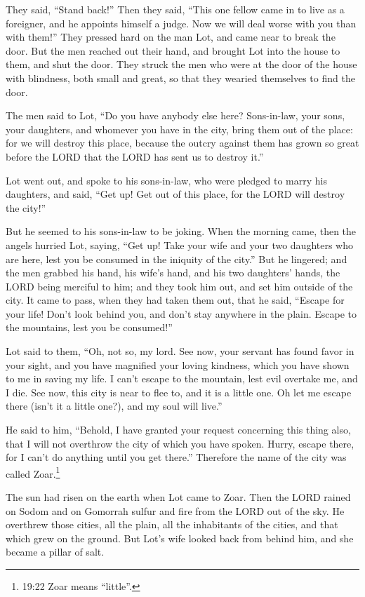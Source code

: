 \myverse{}They said, “Stand back!” Then they said, “This one fellow came in to live as a foreigner, and he appoints himself a judge. Now we will deal worse with you than with them!” They pressed hard on the man Lot, and came near to break the door. \myverse{}But the men reached out their hand, and brought Lot into the house to them, and shut the door. \myverse{}They struck the men who were at the door of the house with blindness, both small and great, so that they wearied themselves to find the door.

\myverse{}The men said to Lot, “Do you have anybody else here? Sons-in-law, your sons, your daughters, and whomever you have in the city, bring them out of the place: \myverse{}for we will destroy this place, because the outcry against them has grown so great before the LORD that the LORD has sent us to destroy it.”

\myverse{}Lot went out, and spoke to his sons-in-law, who were pledged to marry his daughters, and said, “Get up! Get out of this place, for the LORD will destroy the city!”

But he seemed to his sons-in-law to be joking. \myverse{}When the morning came, then the angels hurried Lot, saying, “Get up! Take your wife and your two daughters who are here, lest you be consumed in the iniquity of the city.” \myverse{}But he lingered; and the men grabbed his hand, his wife’s hand, and his two daughters’ hands, the LORD being merciful to him; and they took him out, and set him outside of the city. \myverse{}It came to pass, when they had taken them out, that he said, “Escape for your life! Don’t look behind you, and don’t stay anywhere in the plain. Escape to the mountains, lest you be consumed!”

\myverse{}Lot said to them, “Oh, not so, my lord. \myverse{}See now, your servant has found favor in your sight, and you have magnified your loving kindness, which you have shown to me in saving my life. I can’t escape to the mountain, lest evil overtake me, and I die. \myverse{}See now, this city is near to flee to, and it is a little one. Oh let me escape there (isn’t it a little one?), and my soul will live.”

\myverse{}He said to him, “Behold, I have granted your request concerning this thing also, that I will not overthrow the city of which you have spoken. \myverse{}Hurry, escape there, for I can’t do anything until you get there.” Therefore the name of the city was called Zoar.\footnote{19:22 Zoar means “little”.}

\myverse{}The sun had risen on the earth when Lot came to Zoar. \myverse{}Then the LORD rained on Sodom and on Gomorrah sulfur and fire from the LORD out of the sky. \myverse{}He overthrew those cities, all the plain, all the inhabitants of the cities, and that which grew on the ground. \myverse{}But Lot’s wife looked back from behind him, and she became a pillar of salt.

